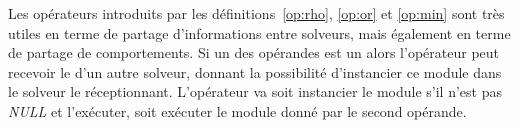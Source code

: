 %
%
%
%

Les  opérateurs   introduits  par  les   définitions~\ref{op:rho}, \ref{op:or} et \ref{op:min} sont très  utiles en  terme de  partage d'informations entre   solveurs, mais également en terme de partage de comportements. Si un  des opérandes est un  \opch{} alors l'opérateur peut recevoir le \om{} d'un autre solveur, donnant la possibilité d'instancier ce module dans le solveur le réceptionnant. L'opérateur va soit instancier le module s'il  n'est pas {\it NULL} et l'exécuter, soit exécuter le module donné par le second opérande.

